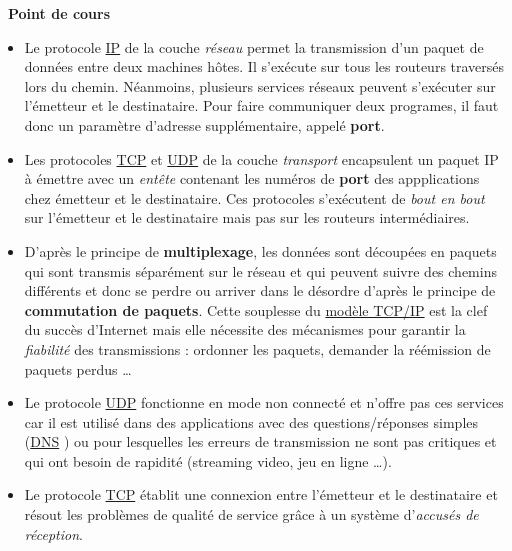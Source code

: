 \documentclass[
  11pt,
]{article}
\newcounter{cours}
\newenvironment{cours}[1]
{\par \medskip   \addtocounter{cours}{1} \noindent  
\begin{bclogo}[arrondi =0.1,  ombre = true, barre=none, logo=\bcbook, marge=4]{~\textbf{Point de cours} \textbf{\thecours} {\itshape #1} }  \par}
{
\end{bclogo}
 \par \bigskip }
\newcounter{prog}
\begin{document}
\begin{cours}{}
\begin{itemize}
\item
  Le protocole
  \href{https://fr.wikipedia.org/wiki/Internet_Protocol}{IP} de la
  couche \emph{réseau} permet la transmission d'un paquet de données
  entre deux machines hôtes. Il s'exécute sur tous les routeurs
  traversés lors du chemin. Néanmoins, plusieurs services réseaux
  peuvent s'exécuter sur l'émetteur et le destinataire. Pour faire
  communiquer deux programes, il faut donc un paramètre d'adresse
  supplémentaire, appelé \textbf{port}.
\item
  Les protocoles
  \href{https://fr.wikipedia.org/wiki/Transmission_Control_Protocol}{TCP}
  et \href{https://fr.wikipedia.org/wiki/User_Datagram_Protocol}{UDP} de
  la couche \emph{transport} encapsulent un paquet IP à émettre avec un
  \emph{entête} contenant les numéros de \textbf{port} des appplications
  chez émetteur et le destinataire. Ces protocoles s'exécutent de
  \emph{bout en bout} sur l'émetteur et le destinataire mais pas sur les
  routeurs intermédiaires.
\item
  D'après le principe de \textbf{multiplexage}, les données sont
  découpées en paquets qui sont transmis séparément sur le réseau et qui
  peuvent suivre des chemins différents et donc se perdre ou arriver
  dans le désordre d'après le principe de \textbf{commutation de
  paquets}. Cette souplesse du
  \href{https://fr.wikipedia.org/wiki/Suite_des_protocoles_Internet}{modèle
  TCP/IP} est la clef du succès d'Internet mais elle nécessite des
  mécanismes pour garantir la \emph{fiabilité} des transmissions :
  ordonner les paquets, demander la réémission de paquets perdus
  \ldots{}
\item
  Le protocole
  \href{https://fr.wikipedia.org/wiki/User_Datagram_Protocol}{UDP}
  fonctionne en mode non connecté et n'offre pas ces services car il est
  utilisé dans des applications avec des questions/réponses simples
  (\href{https://fr.wikipedia.org/wiki/Domain_Name_System}{DNS} ) ou
  pour lesquelles les erreurs de transmission ne sont pas critiques et
  qui ont besoin de rapidité (streaming video, jeu en ligne \ldots).
\item
  Le protocole
  \href{https://fr.wikipedia.org/wiki/Transmission_Control_Protocol}{TCP}
  établit une connexion entre l'émetteur et le destinataire et résout
  les problèmes de qualité de service grâce à un système d'\emph{accusés
  de réception}.
\end{itemize}

\end{cours}
\end{document}
